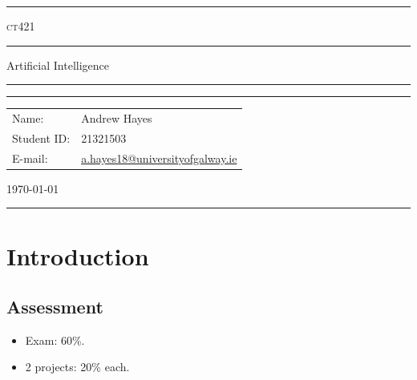 \documentclass[a4paper,11pt]{article}
\author{Andrew Hayes}
\begin{document}
\begin{titlepage}
    \begin{center}
        \hrule
        \vspace*{0.6cm}
        \Huge \textsc{ct421}
        \vspace*{0.6cm}
        \hrule
        \LARGE
       \vspace{0.5cm}
       Artificial Intelligence
       \vspace{0.5cm}
       \hrule

       \vfill

       \hrule
        \begin{minipage}{0.495\textwidth} 
            \vspace{0.4em}
            \raggedright
            \normalsize 
            \begin{tabular}{@{}l l}
                Name: & Andrew Hayes \\
                Student ID: & 21321503 \\
                E-mail: & \href{mailto://a.hayes18@universityofgalway.ie}{a.hayes18@universityofgalway.ie} \\
            \end{tabular}
        \end{minipage}
        \begin{minipage}{0.495\textwidth} 
            \raggedleft
            \vspace*{0.8cm}
            \Large
            \today
            \vspace*{0.6cm}
        \end{minipage}
        \medskip\hrule 
    \end{center}
\end{titlepage}

\newpage
\tableofcontents
\newpage
\setcounter{page}{1}

\section{Introduction}
\subsection{Assessment}
\begin{itemize}
    \item   Exam: 60\%.
    \item   2 projects: 20\% each.
\end{itemize}
\end{document}
